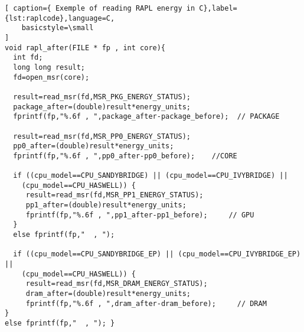 \begin{lstlisting}[ caption={ Exemple of reading RAPL energy in C},label={lst:raplcode},language=C,
    basicstyle=\small
]
void rapl_after(FILE * fp , int core){ 
  int fd;
  long long result;
  fd=open_msr(core);

  result=read_msr(fd,MSR_PKG_ENERGY_STATUS);
  package_after=(double)result*energy_units;
  fprintf(fp,"%.6f , ",package_after-package_before);  // PACKAGE
  
  result=read_msr(fd,MSR_PP0_ENERGY_STATUS);
  pp0_after=(double)result*energy_units;
  fprintf(fp,"%.6f , ",pp0_after-pp0_before);    //CORE

  if ((cpu_model==CPU_SANDYBRIDGE) || (cpu_model==CPU_IVYBRIDGE) ||
	(cpu_model==CPU_HASWELL)) {
     result=read_msr(fd,MSR_PP1_ENERGY_STATUS);
     pp1_after=(double)result*energy_units;
     fprintf(fp,"%.6f , ",pp1_after-pp1_before);     // GPU
  }  
  else fprintf(fp,"  , ");   
  
  if ((cpu_model==CPU_SANDYBRIDGE_EP) || (cpu_model==CPU_IVYBRIDGE_EP) ||
	(cpu_model==CPU_HASWELL)) {
     result=read_msr(fd,MSR_DRAM_ENERGY_STATUS);
     dram_after=(double)result*energy_units;
     fprintf(fp,"%.6f , ",dram_after-dram_before);     // DRAM
}
else fprintf(fp,"  , "); }
\end{lstlisting}
